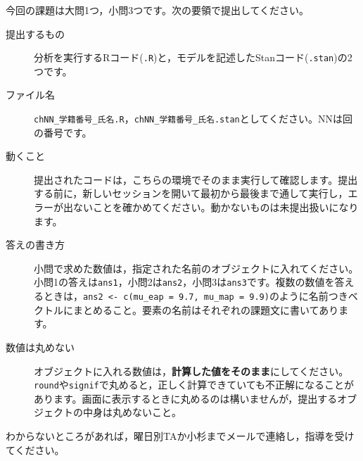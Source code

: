 今回の課題は大問1つ，小問3つです。次の要領で提出してください。
\begin{description}
	\item[提出するもの] 分析を実行するRコード(\texttt{.R})と，モデルを記述したStanコード(\texttt{.stan})の2つです。
	\item[ファイル名] \texttt{chNN\_学籍番号\_氏名.R}，\texttt{chNN\_学籍番号\_氏名.stan}としてください。NNは回の番号です。
	\item[動くこと] 提出されたコードは，こちらの環境でそのまま実行して確認します。提出する前に，新しいセッションを開いて最初から最後まで通して実行し，エラーが出ないことを確かめてください。動かないものは未提出扱いになります。
	\item[答えの書き方] 小問で求めた数値は，指定された名前のオブジェクトに入れてください。小問1の答えは\verb|ans1|，小問2は\verb|ans2|，小問3は\verb|ans3|です。複数の数値を答えるときは，\verb|ans2 <- c(mu_eap = 9.7, mu_map = 9.9)|のように名前つきベクトルにまとめること。要素の名前はそれぞれの課題文に書いてあります。
	\item[数値は丸めない] オブジェクトに入れる数値は，\textbf{計算した値をそのまま}にしてください。\verb|round|や\verb|signif|で丸めると，正しく計算できていても不正解になることがあります。画面に表示するときに丸めるのは構いませんが，提出するオブジェクトの中身は丸めないこと。
\end{description}
わからないところがあれば，曜日別TAか小杉までメールで連絡し，指導を受けてください。

